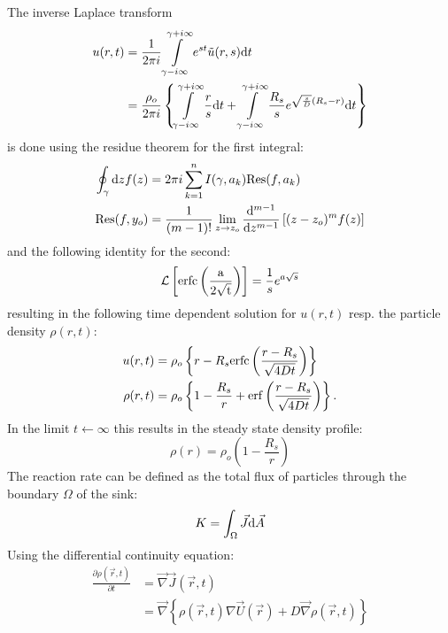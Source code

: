 The inverse Laplace transform
\begin{align}
    u(r,t)  &= \frac{1}{2 \pi i} \int\limits_{\gamma - i \infty}^{\gamma + i \infty}  e^{st} \tilde{u}(r,s){\rm d}t \\
    &= \frac{\rho_o}{ 2 \pi i} \left\{  \int\limits_{\gamma - i \infty}^{\gamma + i \infty} \frac{r}{s}  {\rm d}t +  \int\limits_{\gamma - i \infty}^{\gamma + i \infty}\frac{R_s}{s} e^{ \sqrt{\frac{s}{D}}(R_s - r) }  {\rm d}t \right\}
    \label{inverse laplace}
\end{align}
is done using the residue theorem for the first integral:
\begin{align}
    \oint_{ \gamma } {\rm d}z f(z) &= 2 \pi i \sum_{k = 1}^{n}I(\gamma, a_k) {\rm Res}(f,a_k) \\
    { \rm Res}(f,y_o) &= \frac{1}{(m-1)!} \lim_{z\rightarrow z_o} \frac{{ \rm d} ^{m-1}}{{\rm d} z^{m-1}} \left[ (z - z_o)^{m}f(z) \right]
    \label{residue theorem}
\end{align}
and the following identity for the second:
\begin{equation}
    \mathcal{L}\left[ {\rm erfc\left( \frac{a}{2\sqrt{t}} \right)} \right] = \frac{1}{s}e^{a\sqrt{s}}
    \label{L(erfc)}
\end{equation}
resulting in the following time dependent solution for $u(r,t)$ resp. the particle density $\rho(r,t)$:
\begin{align}
    u(r,t) &= \rho_o \left\{ r - R_s {\rm erfc} \left( \frac{r - R_s}{\sqrt{4 D t}} \right) \right\} \\
    \rho(r,t) &= \rho_o \left\{ 1 - \frac{R_s}{r} + {\rm erf} \left( \frac{r - R_s}{\sqrt{4Dt}} \right) \right\}.
    \label{u(r,t)}
\end{align}
In the limit $t \leftarrow \infty$ this results in the steady state density profile:
\begin{equation}
    \rho(r) =  \rho_o \left( 1 - \frac{R_s}{r} \right)
    \label{steady state density}
\end{equation}
The reaction rate can be defined as the total flux of particles through the boundary $\Omega$ of the sink:
\begin{equation}
    K = \int_\Omega \vec{J} {\rm d}\vec{A} 
    \label{reaction rate}
\end{equation}
Using the differential continuity equation:
\begin{align}
    \frac{\partial \rho(\vec{r},t)}{\partial t}&= \vec{\nabla} \vec{J}(\vec{r},t) \\
    &= \vec{\nabla} \left\{ \rho(\vec{r},t) \nabla \vec{U}(\vec{r}) + D \vec{\nabla} \rho(\vec{r},t) \right\}
    \label{contiuity equation}
\end{align}
